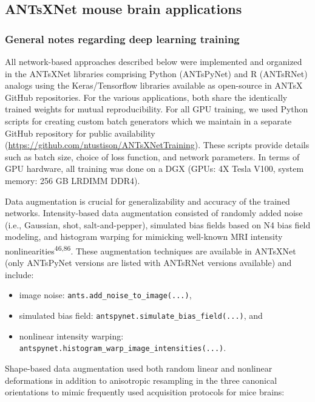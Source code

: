 \documentclass[
  12pt,
]{article}
\begin{document}
\subsection{ANTsXNet mouse brain
applications}\label{antsxnet-mouse-brain-applications}

\subsubsection{General notes regarding deep learning
training}\label{general-notes-regarding-deep-learning-training}

All network-based approaches described below were implemented and
organized in the ANTsXNet libraries comprising Python (ANTsPyNet) and R
(ANTsRNet) analogs using the Keras/Tensorflow libraries available as
open-source in ANTsX GitHub repositories. For the various applications,
both share the identically trained weights for mutual reproducibility.
For all GPU training, we used Python scripts for creating custom batch
generators which we maintain in a separate GitHub repository for public
availability (\url{https://github.com/ntustison/ANTsXNetTraining}).
These scripts provide details such as batch size, choice of loss
function, and network parameters. In terms of GPU hardware, all training
was done on a DGX (GPUs: 4X Tesla V100, system memory: 256 GB LRDIMM
DDR4).

Data augmentation is crucial for generalizability and accuracy of the
trained networks. Intensity-based data augmentation consisted of
randomly added noise (i.e., Gaussian, shot, salt-and-pepper), simulated
bias fields based on N4 bias field modeling, and histogram warping for
mimicking well-known MRI intensity
nonlinearities\textsuperscript{46,86}. These augmentation techniques are
available in ANTsXNet (only ANTsPyNet versions are listed with ANTsRNet
versions available) and include:

\begin{itemize}
\item
  image noise: \texttt{ants.add\_noise\_to\_image(...)},
\item
  simulated bias field: \texttt{antspynet.simulate\_bias\_field(...)},
  and
\item
  nonlinear intensity warping:
  \texttt{antspynet.histogram\_warp\_image\_intensities(...)}.
\end{itemize}

Shape-based data augmentation used both random linear and nonlinear
deformations in addition to anisotropic resampling in the three
canonical orientations to mimic frequently used acquisition protocols
for mice brains:
\end{document}
